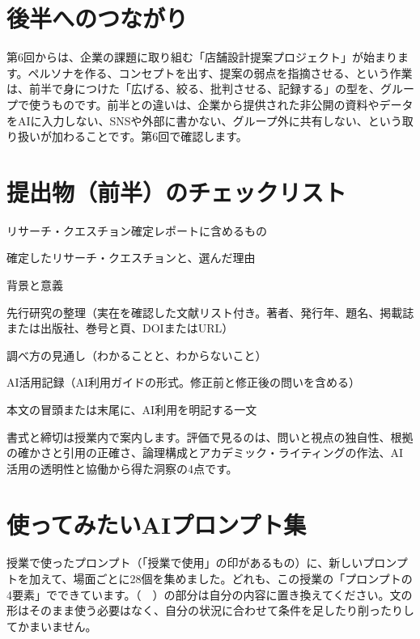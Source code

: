 \section{後半へのつながり}

第6回からは、企業の課題に取り組む「店舗設計提案プロジェクト」が始まります。ペルソナを作る、コンセプトを出す、提案の弱点を指摘させる、という作業は、前半で身につけた「広げる、絞る、批判させる、記録する」の型を、グループで使うものです。前半との違いは、企業から提供された非公開の資料やデータをAIに入力しない、SNSや外部に書かない、グループ外に共有しない、という取り扱いが加わることです。第6回で確認します。

\section{提出物（前半）のチェックリスト}

\begin{keybox}{リサーチ・クエスチョン確定レポートに含めるもの}
\begin{checks}
  \item 確定したリサーチ・クエスチョンと、選んだ理由
  \item 背景と意義
  \item 先行研究の整理（実在を確認した文献リスト付き。著者、発行年、題名、掲載誌または出版社、巻号と頁、DOIまたはURL）
  \item 調べ方の見通し（わかることと、わからないこと）
  \item AI活用記録（AI利用ガイドの形式。修正前と修正後の問いを含める）
  \item 本文の冒頭または末尾に、AI利用を明記する一文
\end{checks}
書式と締切は授業内で案内します。評価で見るのは、問いと視点の独自性、根拠の確かさと引用の正確さ、論理構成とアカデミック・ライティングの作法、AI活用の透明性と協働から得た洞察の4点です。
\end{keybox}

\appendixmode

\section{使ってみたいAIプロンプト集}

授業で使ったプロンプト（「授業で使用」の印があるもの）に、新しいプロンプトを加えて、場面ごとに28個を集めました。どれも、この授業の「プロンプトの4要素」でできています。（　）の部分は自分の内容に置き換えてください。文の形はそのまま使う必要はなく、自分の状況に合わせて条件を足したり削ったりしてかまいません。

